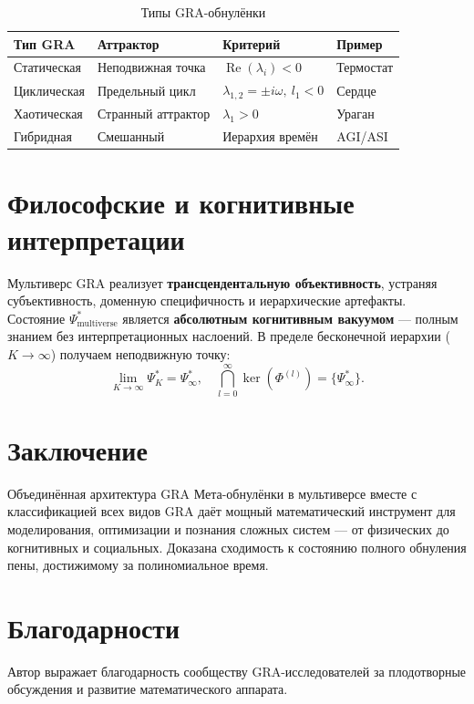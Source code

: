 \documentclass[12pt,a4paper]{article}
\begin{document}
\begin{table}[h]
\centering
\caption{Типы GRA-обнулёнки}
\label{tab:types}
\begin{tabular}{|l|l|l|l|}
\hline
Тип GRA & Аттрактор & Критерий & Пример \\
\hline
Статическая & Неподвижная точка & \(\operatorname{Re}(\lambda_i)<0\) & Термостат \\
\hline
Циклическая & Предельный цикл & \(\lambda_{1,2}=\pm i\omega,\ l_1<0\) & Сердце \\
\hline
Хаотическая & Странный аттрактор & \(\lambda_1>0\) & Ураган \\
\hline
Гибридная & Смешанный & Иерархия времён & AGI/ASI \\
\hline
\end{tabular}
\end{table}

\section{Философские и когнитивные интерпретации}

Мультиверс GRA реализует \textbf{трансцендентальную объективность}, устраняя субъективность, доменную специфичность и иерархические артефакты. Состояние \(\Psi_{\text{multiverse}}^*\) является \textbf{абсолютным когнитивным вакуумом} — полным знанием без интерпретационных наслоений. В пределе бесконечной иерархии (\(K\to\infty\)) получаем неподвижную точку:
\[
\boxed{\lim_{K\to\infty} \Psi_K^* = \Psi_\infty^*,\quad \bigcap_{l=0}^{\infty} \ker(\Phi^{(l)}) = \{\Psi_\infty^*\}}.
\]

\section{Заключение}

Объединённая архитектура GRA Мета-обнулёнки в мультиверсе вместе с классификацией всех видов GRA даёт мощный математический инструмент для моделирования, оптимизации и познания сложных систем — от физических до когнитивных и социальных. Доказана сходимость к состоянию полного обнуления пены, достижимому за полиномиальное время.

\section*{Благодарности}

Автор выражает благодарность сообществу GRA-исследователей за плодотворные обсуждения и развитие математического аппарата.
\end{document}
